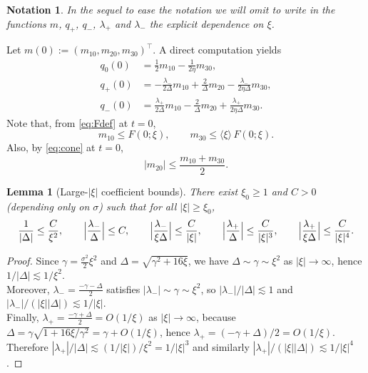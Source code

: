 \documentclass{article}
\newcommand{\ang}[1]{\langle #1\rangle}
\newtheorem{lemma}[theorem]{Lemma}
\newtheorem*{notation*}{Notation}
\begin{document}
\begin{notation*}
In the sequel to ease the notation we will omit to write in the functions $m$, $q_+$, $q_-$, $\lambda_+$ and $\lambda_-$ the explicit dependence on $\xi$.
\end{notation*}
  
Let $m(0):=(m_{10},m_{20},m_{30})^\top$. A direct computation yields
\begin{align}
q_0(0) &= \frac12 m_{10}-\frac{1}{2\eta}m_{30}, \label{eq:q0}\\
q_+(0) &= -\frac{\lambda_-}{2\Delta}m_{10}
         +\frac{2}{\Delta}m_{20}
         -\frac{\lambda_-}{2\eta\Delta}m_{30},\label{eq:qp}\\
q_-(0) &= \frac{\lambda_+}{2\Delta}m_{10}
         -\frac{2}{\Delta}m_{20}
         +\frac{\lambda_+}{2\eta\Delta}m_{30}. \label{eq:qm}
\end{align}
Note that, from \eqref{eq:Fdef} at $t=0$,
\begin{equation}\label{eq:F0-trivial}
m_{10}\le F(0;\xi),\qquad m_{30}\le \ang{\xi}\,F(0;\xi).
\end{equation}
Also, by \eqref{eq:cone} at $t=0$,
\begin{equation}\label{eq:m20-bound}
|m_{20}|\le \frac{m_{10}+m_{30}}{2}.
\end{equation}

\begin{lemma}[Large-$|\xi|$ coefficient bounds]\label{lem:coef}
There exist $\xi_0\ge1$ and $C>0$ (depending only on $\sigma$) such that for all $|\xi|\ge\xi_0$,
\begin{equation}\label{eq:coef}
\frac1{|\Delta|}\le\frac{C}{\xi^2},\qquad
\Bigl|\frac{\lambda_-}{\Delta}\Bigr|\le C,\qquad
\Bigl|\frac{\lambda_-}{\xi\Delta}\Bigr|\le\frac{C}{|\xi|},\qquad
\Bigl|\frac{\lambda_+}{\Delta}\Bigr|\le\frac{C}{|\xi|^3},\qquad
\Bigl|\frac{\lambda_+}{\xi\Delta}\Bigr|\le\frac{C}{|\xi|^4}.
\end{equation}
\end{lemma}

\begin{proof}
Since $\gamma=\frac{\sigma^2}{2}\xi^2$ and $\Delta=\sqrt{\gamma^2+16\xi}$, we have $\Delta\sim \gamma\sim \xi^2$ as $|\xi|\to\infty$,
hence $1/|\Delta|\lesssim 1/\xi^2$.\\
Moreover, $\lambda_-=\frac{-\gamma-\Delta}{2}$ satisfies $|\lambda_-|\sim \gamma\sim \xi^2$, so $|\lambda_-|/|\Delta|\lesssim 1$ and
$|\lambda_-|/(|\xi||\Delta|)\lesssim 1/|\xi|$.\\
Finally, $\lambda_+=\frac{-\gamma+\Delta}{2}=O(1/\xi)$ as $|\xi|\to\infty$, because
$\Delta=\gamma\sqrt{1+16\xi/\gamma^2}=\gamma+O(1/\xi)$, hence
$\lambda_+=(-\gamma+\Delta)/2=O(1/\xi)$. Therefore
$|\lambda_+|/|\Delta|\lesssim (1/|\xi|)/\xi^2=1/|\xi|^3$ and similarly
$|\lambda_+|/(|\xi||\Delta|)\lesssim 1/|\xi|^4$.
\end{proof}
\end{document}
